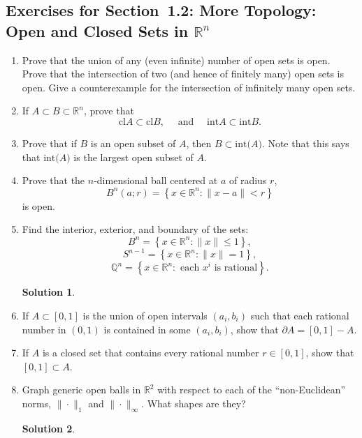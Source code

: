\documentclass[]{book}
\theoremstyle{definition}
\newtheorem*{soln}{Solution}
\newcommand{\bb}[1]{\mathbb{#1}}
\newcommand{\Q}{\bb{Q}}
\newcommand{\R}{\bb{R}}
\newcommand{\bd}{\partial}
\newcommand{\inter}[1]{\mathrm{int}{#1}}
\newcommand{\cl}[1]{\mathrm{cl}{#1}}
\newcommand{\ds}{\displaystyle}
\begin{document}
\subsection*{Exercises for Section~1.2: More Topology: Open and Closed Sets in
$\R^n$}
\begin{enumerate}
\item\label{topology}	Prove that the union of any (even infinite) number of open sets is open.
 Prove that the intersection of two (and hence of finitely many) open sets is
 open.  Give a counterexample for the intersection of infinitely many open sets.

\item\label{clAB}If $A\subset B\subset\R^n$, prove that
	$$\cl{A}\subset\cl{B},\quad\mbox{ and }\quad\inter{A}\subset\inter{B}.$$

\item	Prove that if $B$ is an open subset of $A$, then $B\subset \inter(A)$.  Note that this says that $\inter(A)$ is the largest open subset of $A$.

\item	\label{openset}Prove that the $n$-dimensional ball centered at $a$ of radius $r$, 
	$$\ds B^n(a;r) = \left\{x\in\R^n:\|x-a\|< r\right\}$$ is open. 

\item	Find the interior, exterior, and boundary of the sets:
	$$B^n = \left\{x\in\R^n : \|x\| \leq 1\right\},$$
	$$S^{n-1} = \left\{x\in\R^n : \|x\| = 1\right\},$$
	$$\Q^n = \left\{x\in\R^n : \mbox{ each } x^i\mbox{ is rational}\right\}.$$
\begin{soln}
\end{soln}


\item	If $A\subset[0,1]$ is the union of open intervals $(a_i,b_i)$ such that
each rational number in $(0,1)$ is contained in some $(a_i,b_i)$, show that
$\bd A = [0,1] - A$.

\item	If $A$ is a closed set that contains every rational number $r\in[0,1]$,
show that $[0,1]\subset A$.

\item	Graph generic open balls in $\R^2$ with respect to each of the ``non-Euclidean'' norms, $\|\cdot\|_1$ and $\|\cdot\|_\infty$. 
What shapes are they?
\begin{soln}
\end{soln}

\end{enumerate}
\end{document}
